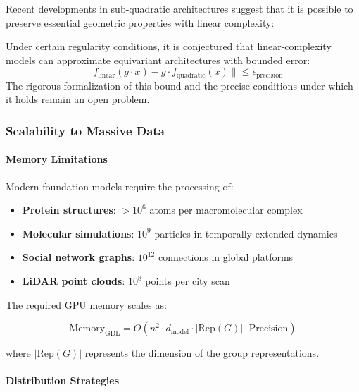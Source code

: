 Recent developments in sub-quadratic architectures suggest that it is possible to preserve essential geometric properties with linear complexity:

\begin{remark}
Under certain regularity conditions, it is conjectured that linear-complexity models can approximate equivariant architectures with bounded error:
\begin{equation}
\|f_{\text{linear}}(g \cdot x) - g \cdot f_{\text{quadratic}}(x)\| \leq \epsilon_{\text{precision}}
\label{eq:linear_equivariance_approximation}
\end{equation}
The rigorous formalization of this bound and the precise conditions under which it holds remain an open problem.
\end{remark}

\subsubsection{Scalability to Massive Data}

\paragraph{Memory Limitations}

Modern foundation models require the processing of:
\begin{itemize}
    \item \textbf{Protein structures}: $>10^6$ atoms per macromolecular complex
    \item \textbf{Molecular simulations}: $10^9$ particles in temporally extended dynamics
    \item \textbf{Social network graphs}: $10^{12}$ connections in global platforms
    \item \textbf{LiDAR point clouds}: $10^8$ points per city scan
\end{itemize}

The required GPU memory scales as:

\begin{equation}
\text{Memory}_{\text{GDL}} = O(n^2 \cdot d_{\text{model}} \cdot |\text{Rep}(G)| \cdot \text{Precision})
\label{eq:gdl_memory_scaling}
\end{equation}

where $|\text{Rep}(G)|$ represents the dimension of the group representations.

\paragraph{Distribution Strategies}

